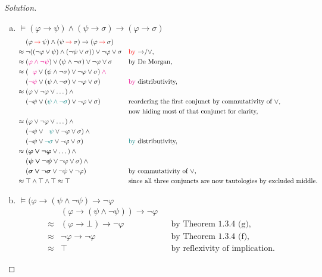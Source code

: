 \documentclass[letter]{article}
\theoremstyle{definition}
\newenvironment{solution}
{\begin{proof}[Solution]}
	{\end{proof}}
\renewcommand{\phi}{\varphi}
\begin{document}
\begin{solution}
\begin{enumerate}[(a)]
  \item $\models (\phi \to \psi) \land (\psi \to \sigma) \to (\phi \to \sigma)$
\begin{align*}
    & (\phi \colop{red}{\to} \psi) \land (\psi \colop{red}{\to} \sigma) \to (\phi \colop{red}{\to} \sigma) &&
\\ \approx{}
    & \neg ((\neg \phi \lor \psi) \land (\neg \psi \lor \sigma)) \lor \neg \phi \lor \sigma
    && \text{\textcolor{red}{by} $\to$/$\lor$,}
\\ \approx{}
    & ({\color{magenta}\phi \land \neg \psi}) \lor (\psi \land \neg \sigma) \lor \neg \phi \lor \sigma
    && \text{by De Morgan,}
\\ \approx{}
    & ({\color{magenta}\phantom{\neg}\phi} \lor (\psi \land \neg \sigma) \lor \neg \phi \lor \sigma) \colop{magenta}{\land} {} &&
\\  & ({\color{magenta}         \neg \psi} \lor (\psi \land \neg \sigma) \lor \neg \phi \lor \sigma)
    && \text{\textcolor{magenta}{by} distributivity,}
\\ \approx{}
    & (\phi \lor \neg \phi \lor \dots) \land {} &&
\\
    & (\neg \psi \lor ({\color{teal}\psi \land \neg \sigma}) \lor \neg \phi \lor \sigma)
    && \text{reordering the first conjunct by commutativity of $\lor$,}
\\ & && \text{now hiding most of that conjunct for clarity,}
\\ \approx{}
    & (\phi \lor \neg \phi \lor \dots) \land {} &&
\\  & (\neg \psi \lor {\color{teal}\phantom{\neg}\psi}   \lor \neg \phi \lor \sigma) \land {} &&
\\  & (\neg \psi \lor {\color{teal}         \neg \sigma} \lor \neg \phi \lor \sigma)
    && \text{\textcolor{teal}{by} distributivity,}
\\ \approx {}
    & (\bm{\phi \lor \neg \phi} \lor \dots) \land {} &&
\\  & (\bm{\psi \lor \neg \psi} \lor \neg \phi \lor \sigma) \land {} &&
\\  & (\bm{\sigma \lor \neg \sigma} \lor \neg \psi \lor \neg \phi)
    && \text{by commutativity of $\lor$,}
\\ \approx {}
    & \top \land \top \land \top \approx \top
    && \text{since all three conjuncts are now tautologies by excluded middle.}
\end{align*}

  \item $\models (\phi \to (\psi \land \neg \psi) \to \neg \phi$
\begin{align*}
  & (\phi \to (\psi \land \neg \psi)) \to \neg \phi &&
\\ \approx{}
  & (\phi \to \bot) \to \neg \phi
  && \text{by Theorem 1.3.4 (g),}
\\ \approx{}
  & \neg \phi \to \neg \phi
  && \text{by Theorem 1.3.4 (f),}
\\ \approx{}
  & \top && \text{by reflexivity of implication.}
\end{align*}


\end{enumerate}
\end{solution}
\end{document}
